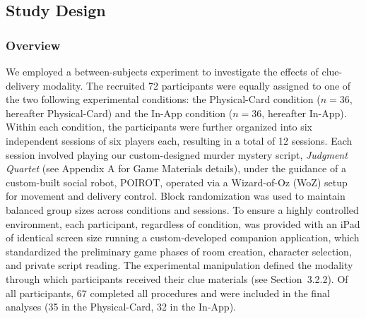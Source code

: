 \documentclass[sigconf,screen]{acmart-tagged}
\newcommand{\rev}[1]{#1}
\begin{document}
\subsection{Study Design}
\subsubsection{Overview}
We employed a between-subjects experiment to investigate the effects of clue-delivery modality. The recruited 72 participants were equally assigned to one of the two following experimental conditions: the Physical-Card condition ($n=36$, hereafter Physical-Card) and the In-App condition ($n=36$, hereafter In-App). Within each condition, the participants were further organized into six independent sessions of six players each, resulting in a total of 12 sessions. Each session involved playing our custom-designed murder mystery script, \textit{Judgment Quartet} (see Appendix A for Game Materials details), under the guidance of a custom-built social robot, POIROT, operated via a Wizard-of-Oz (WoZ) setup for movement and delivery control. Block randomization was used to maintain balanced group sizes across conditions and sessions. To ensure a highly controlled environment, each participant, regardless of condition, was provided with an iPad of identical screen size running a custom-developed companion application, which standardized the preliminary game phases of room creation, character selection, and private script reading. \rev{The experimental manipulation defined the modality through which participants received their clue materials (see Section~3.2.2).} Of all participants, 67 completed all procedures and were included in the final analyses (35 in the Physical-Card, 32 in the In-App).

\vspace{-10pt}
\end{document}
